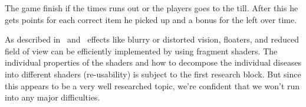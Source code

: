 \documentclass{acm_proc_article-sp}
\begin{document}
The game finish if the times runs out or the players goes to the till. After this he gets points for each correct item he picked up and a bonus for the left over time.





As described in \cite{gazedisplays} and \cite{eyediseasesim} effects like
blurry or distorted vision, floaters, and reduced field of view can be
efficiently implemented by using fragment shaders. The individual properties
of the shaders and how to decompose the individual diseases into different
shaders (re-usability) is subject to the first research block. But since this
appears to be a very well researched topic, we're confident that we won't run
into any major difficulties.
\end{document}
